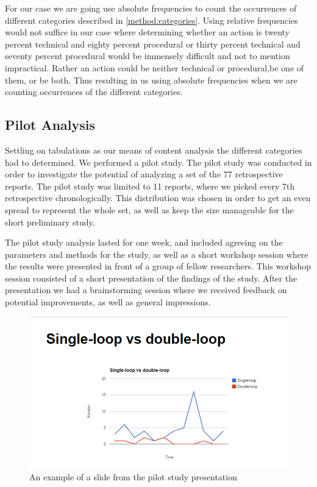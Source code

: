 For our case we are going use absolute frequencies to count the occurrences of different categories described in \autoref{method:categories}. Using relative frequencies would not suffice in our case where determining whether an action is twenty percent technical and eighty percent procedural or thirty percent technical and seventy percent procedural would be immensely difficult and not to mention impractical. Rather an action could be neither technical or procedural,be one of them, or be both. Thus resulting in us using absolute frequencies when we are counting occurrences of the different categories.

\subsection{Pilot Analysis}
Settling on tabulations as our means of content analysis the different categories had to determined. We performed a pilot study.
The pilot study was conducted in order to investigate the potential of analyzing a set of the 77 retrospective reports.  The pilot study was limited to 11 reports, where we picked every 7th retrospective chronologically. This distribution was chosen in order to get an even spread to represent the whole set, as well as keep the size manageable for the short preliminary study.

The pilot study analysis lasted for one week, and included agreeing on the parameters and methods for the study, as well as a short workshop session where the results were presented in front of a group of fellow researchers. This workshop session consisted of a short presentation of the findings of the study. After the presentation we had a brainstorming session where we received feedback on potential improvements, as well as general impressions. 

\begin{figure}[!h]
	\centering
	\includegraphics[width=\textwidth]{figures/Pilot_loop.PNG}
	\caption{An example of a slide from the pilot study presentation }
	\label{figure:Pilot Slide}
\end{figure}

